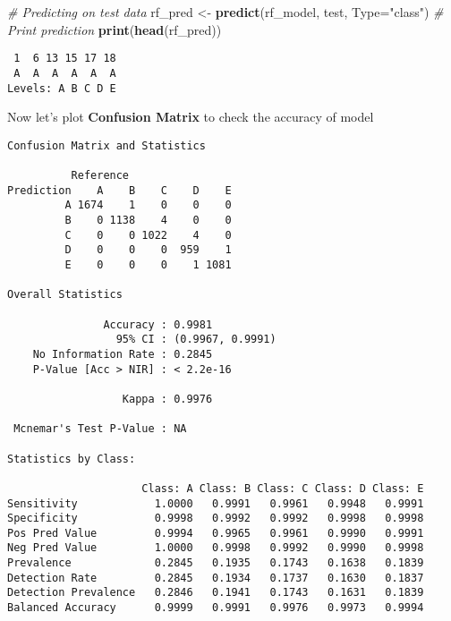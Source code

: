 \documentclass[
  10pt,
  a4paper]{article}
\newenvironment{Shaded}{\begin{snugshade}}{\end{snugshade}}
\newcommand{\CommentTok}[1]{\textcolor[rgb]{0.56,0.35,0.01}{\textit{#1}}}
\newcommand{\DataTypeTok}[1]{\textcolor[rgb]{0.13,0.29,0.53}{#1}}
\newcommand{\KeywordTok}[1]{\textcolor[rgb]{0.13,0.29,0.53}{\textbf{#1}}}
\newcommand{\NormalTok}[1]{#1}
\newcommand{\OperatorTok}[1]{\textcolor[rgb]{0.81,0.36,0.00}{\textbf{#1}}}
\newcommand{\StringTok}[1]{\textcolor[rgb]{0.31,0.60,0.02}{#1}}
\begin{document}
\begin{Shaded}
\begin{Highlighting}[]
\CommentTok{# Predicting on test data}
\NormalTok{rf_pred <-}\StringTok{ }\KeywordTok{predict}\NormalTok{(rf_model, test, }\DataTypeTok{Type=}\StringTok{"class"}\NormalTok{)}
\CommentTok{# Print prediction}
\KeywordTok{print}\NormalTok{(}\KeywordTok{head}\NormalTok{(rf_pred))}
\end{Highlighting}
\end{Shaded}

\begin{verbatim}
 1  6 13 15 17 18 
 A  A  A  A  A  A 
Levels: A B C D E
\end{verbatim}

Now let's plot \textbf{Confusion Matrix} to check the accuracy of model

\begin{Shaded}
\end{Shaded}

\begin{verbatim}
Confusion Matrix and Statistics

          Reference
Prediction    A    B    C    D    E
         A 1674    1    0    0    0
         B    0 1138    4    0    0
         C    0    0 1022    4    0
         D    0    0    0  959    1
         E    0    0    0    1 1081

Overall Statistics
                                          
               Accuracy : 0.9981          
                 95% CI : (0.9967, 0.9991)
    No Information Rate : 0.2845          
    P-Value [Acc > NIR] : < 2.2e-16       
                                          
                  Kappa : 0.9976          
                                          
 Mcnemar's Test P-Value : NA              

Statistics by Class:

                     Class: A Class: B Class: C Class: D Class: E
Sensitivity            1.0000   0.9991   0.9961   0.9948   0.9991
Specificity            0.9998   0.9992   0.9992   0.9998   0.9998
Pos Pred Value         0.9994   0.9965   0.9961   0.9990   0.9991
Neg Pred Value         1.0000   0.9998   0.9992   0.9990   0.9998
Prevalence             0.2845   0.1935   0.1743   0.1638   0.1839
Detection Rate         0.2845   0.1934   0.1737   0.1630   0.1837
Detection Prevalence   0.2846   0.1941   0.1743   0.1631   0.1839
Balanced Accuracy      0.9999   0.9991   0.9976   0.9973   0.9994
\end{verbatim}
\end{document}
